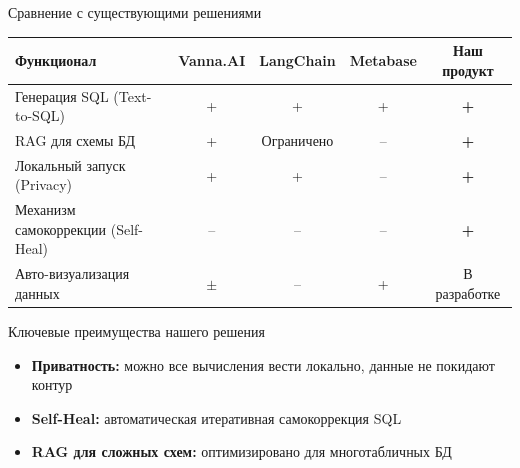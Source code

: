 \documentclass[10pt, aspectratio=169, unicode]{beamer}
\begin{document}
\begin{frame}{Сравнение с существующими решениями}
  \begin{table}
    \centering
    \small
    \begin{tabularx}{\textwidth}{|>{\raggedright\arraybackslash}X|c|c|c|c|}
      \hline
      \textbf{Функционал} & \textbf{Vanna.AI} & \textbf{LangChain} & \textbf{Metabase} & \textbf{Наш продукт} \\
      \hline
      Генерация SQL (Text-to-SQL)      & + & + & + & \textbf{+} \\
      \hline
      RAG для схемы БД                 & + & Ограничено & -- & \textbf{+} \\
      \hline
      Локальный запуск (Privacy)       & + & + & -- & \textbf{+} \\
      \hline
      Механизм самокоррекции (Self-Heal) & -- & -- & -- & \textbf{+} \\
      \hline
      Авто-визуализация данных         & $\pm$ & -- & + & В разработке \\
      \hline
    \end{tabularx}
  \end{table}

  \vspace{6pt}
  \begin{block}{Ключевые преимущества нашего решения}
    \begin{itemize}
      \item \textbf{Приватность:} можно все вычисления вести локально, данные не покидают контур
      \item \textbf{Self-Heal:} автоматическая итеративная самокоррекция SQL
      \item \textbf{RAG для сложных схем:} оптимизировано для многотабличных БД
    \end{itemize}
  \end{block}
\end{frame}
\end{document}
